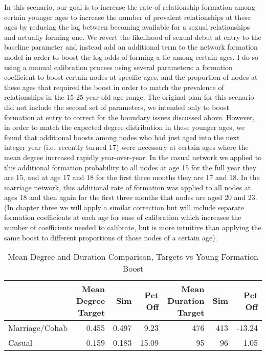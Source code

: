 \documentclass [11pt, proquest] {uwthesis}[2015/03/03]
\begin{document}
In this scenario, our goal is to increase the rate of relationship formation among certain younger ages to increase the number of prevalent relationships at these ages by reducing the lag between becoming available for a sexual relationships and actually forming one. We revert the likelihood of sexual debut at entry to the baseline parameter and instead add an additional term to the network formation model in order to boost the log-odds of forming a tie among certain ages. I do so using a manual calibration process using several parameters: a formation coefficient to boost certain nodes at specific ages, and the proportion of nodes at these ages that required the boost in order to match the prevalence of relationships in the 15-25 year-old age range. The original plan for this scenario did not include the second set of parameters, we intended only to boost formation at entry to correct for the boundary issues discussed above. However, in order to match the expected degree distribution in these younger ages, we found that additional boosts among nodes who had just aged into the next integer year (i.e.~recently turned 17) were necessary at certain ages where the mean degree increased rapidly year-over-year. In the casual network we applied to this additional formation probability to all nodes at age 15 for the full year they are 15, and at age 17 and 18 for the first three months they are 17 and 18. In the marriage network, this additional rate of formation was applied to all nodes at ages 18 and then again for the first three months that nodes are aged 20 and 23. (In chapter three we will apply a similar correction but will include separate formation coefficients at each age for ease of calibration which increases the number of coefficients needed to calibrate, but is more intuitive than applying the same boost to different proportions of those nodes of a certain age).
\begin{table}

\caption{\label{tab:youngboost-tab}Mean Degree and Duration Comparison, Targets vs Young Formation Boost}
\centering
\begin{tabular}[t]{lrrrrrr}
\toprule
  & Mean Degree Target & Sim & Pct Off & Mean Duration Target & Sim & Pct Off\\
\midrule
Marriage/Cohab & 0.455 & 0.497 & 9.23 & 476 & 413 & -13.24\\
Casual & 0.159 & 0.183 & 15.09 & 95 & 96 & 1.05\\
\bottomrule
\end{tabular}
\end{table}
\end{document}
